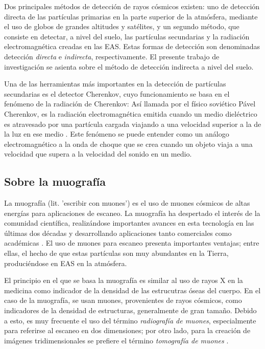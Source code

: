 \documentclass[12pt]{report}
\begin{document}
Dos principales métodos de detección de rayos cósmicos existen: uno de detección directa de las partículas primarias en la parte superior de la atmósfera, mediante el uso de globos de grandes altitudes y satélites, y un segundo método, que consiste en detectar, a nivel del suelo, las partículas secundarias y la radiación electromagnética creadas en las EAS. Estas formas de detección son denominadas detección \textit{directa} e \textit{indirecta}, respectivamente. El presente trabajo de investigación se asienta sobre el método de detección indirecta a nivel del suelo.

Una de las herramientas más importantes en la detección de partículas secundarias es el detector Cherenkov, cuyo funcionamiento se basa en el fenómeno de la radiación de Cherenkov: Así llamada por el físico soviético Pável Cherenkov, es la radiación electromagnética emitida cuando un medio dieléctrico es atravesado por una partícula cargada viajando a una velocidad superior a la de la luz en ese medio \cite{jelley1955cerenkov}. Este fenómeno se puede entender como un análogo electromagnético a la onda de choque que se crea cuando un objeto viaja a una velocidad que supera a la velocidad del sonido en un medio.



\subsection*{Sobre la muografía}

La muografía (lit. 'escribir con muones') es el uso de muones cósmicos de altas energías para aplicaciones de escaneo. La muografía ha despertado el interés de la comunidad científica, realizándose importantes avances en esta tecnología en las últimas dos décadas y desarrollando aplicaciones tanto comerciales como académicas \cite{kaiser2019muography}. El uso de muones para escaneo presenta importantes ventajas; entre ellas, el hecho de que estas partículas son muy abundantes en la Tierra, produciéndose en EAS en la atmósfera.

El principio en el que se basa la muografía es similar al uso de rayos X en la medicina como indicador de la densidad de las estrucutras óseas del cuerpo. En el caso de la muografía, se usan muones, provenientes de rayos cósmicos, como indicadores de la densidad de estructuras, generalmente de gran tamaño. Debido a esto, es muy frecuente el uso del término \textit{radiografía de muones}, especialmente para referirse al escaneo en dos dimensiones; por otro lado, para la creación de imágenes tridimensionales se prefiere el término \textit{tomografía de muones} \cite{kaiser2019muography}.
\end{document}
